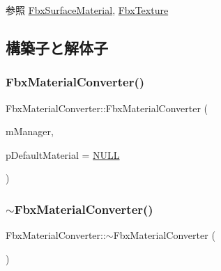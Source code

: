 \begin{DoxySeeAlso}{参照}
\hyperlink{class_fbx_surface_material}{Fbx\+Surface\+Material}, \hyperlink{class_fbx_texture}{Fbx\+Texture} 
\end{DoxySeeAlso}


\subsection{構築子と解体子}
\mbox{\label{class_fbx_material_converter_a3ad6376fa570214f45f836e4152d088a}} 
\subsubsection{\texorpdfstring{Fbx\+Material\+Converter()}{FbxMaterialConverter()}}
{\footnotesize\ttfamily Fbx\+Material\+Converter\+::\+Fbx\+Material\+Converter (\begin{DoxyParamCaption}\item[{\hyperlink{class_fbx_manager}{Fbx\+Manager} \&}]{m\+Manager,  }\item[{\hyperlink{class_fbx_surface_material}{Fbx\+Surface\+Material} $\ast$}]{p\+Default\+Material = {\ttfamily \hyperlink{fbxarch_8h_a070d2ce7b6bb7e5c05602aa8c308d0c4}{N\+U\+LL}} }\end{DoxyParamCaption})}

\mbox{\label{class_fbx_material_converter_a3941bfb660ca110cbef7d104e223e7a4}} 
\subsubsection{\texorpdfstring{$\sim$\+Fbx\+Material\+Converter()}{~FbxMaterialConverter()}}
{\footnotesize\ttfamily Fbx\+Material\+Converter\+::$\sim$\+Fbx\+Material\+Converter (\begin{DoxyParamCaption}{ }\end{DoxyParamCaption})}



